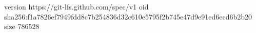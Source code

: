 version https://git-lfs.github.com/spec/v1
oid sha256:f1a7826ef7949fdd8c7b254836d32c610e5795f2b745e47d9e91ed6ecd6b2b20
size 786528
